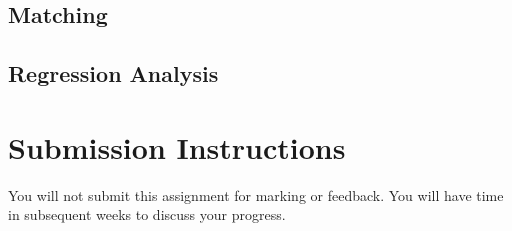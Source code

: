 \documentclass[a4paper,12pt]{article}
\begin{document}
\begin{enumerate*}
\item 
\end{enumerate*}

\subsection{Matching}

\begin{enumerate*}
\item 
\end{enumerate*}

\subsection{Regression Analysis}

\begin{enumerate*}
\item 
\end{enumerate*}


\section{Submission Instructions}

You will not submit this assignment for marking or feedback. You will have time in subsequent weeks to discuss your progress.
\end{document}
